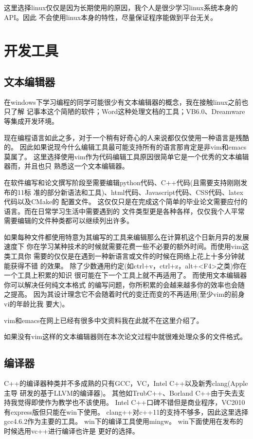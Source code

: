 这里选择linux仅仅是因为长期使用的原因，我个人是很少学习linux系统本身的API。因此
不会使用linux本身的特性，尽量保证程序能做到平台无关。

\section{开发工具}
\subsection{文本编辑器}
在windows下学习编程的同学可能很少有文本编辑器的概念，我在接触linux之前也只了解
记事本这个简陋的软件；Word这种处理文档的工具；VB6.0、Dreamware等集成开发环境。

现在编程语言如此之多，对于一个稍有好奇心的人来说都仅仅使用一种语言是残酷的。
因此如果说现今什么编辑工具最可能支持所有的语言那肯定是非vim和emacs莫属了。
这里选择使用vim作为代码编辑工具原因很简单它是一个优秀的文本编辑器而，并且也只
熟悉这一个文本编辑器。

在软件编写和论文撰写阶段至需要编辑python代码、C++代码(且需要支持刚刚发布的11标
准的部分新语法和工具)、html代码、Javascript代码、CSS代码、latex代码以及CMake的
配置文件。
这仅仅只是在完成这个简单的毕业论文需要应付的语言。而在日常学习生活中需要遇到的
文件类型更是各种各样，仅仅我个人平常需要编辑的文件种类都可以继续列出许多。

如果每种文件都使用特意为其编写的工具来编辑那么在计算机这个日新月异的发展速度下
你在学习某种技术的时候就需要花费一些不必要的额外时间。而使用vim这类工具你
需要的仅仅是在遇到一种新语言或文件的时候在网络上花上十多分钟就能获得不错
的效果。
除了少数通用约定(如ctrl+v，ctrl+z，alt+<F4>之类)你在一个工具上积累的知识
很可能在下一个工具上就不再适用了。 而使用文本编辑器你可以解决任何纯文本格式
的编写问题，你所积累的会越来越多你的效率也会随之提高。
因为其设计理念它不会随着时代的变迁而变的不再适用(至少vim的前身vi的年龄比我
要大)。

vim和emacs在网上已经有很多中文资料我在此就不在这里介绍了。

如果没有vim这样的文本编辑器则在本次论文过程中就很难处理众多的文件格式。

\subsection{编译器}
C++的编译器种类并不多成熟的只有GCC，VC，Intel C++以及新秀clang(Apple主导
研发的基于LLVM的编译器)。
其他如TrubC++、Borland C++由于失去支持我觉得即使作为教学也不该使用。
Intel C++口碑不错但是商业程序，VC2010有express版但只能在win下使用。
clang++对c++11的支持不够多，因此这里选择gcc4.6.2作为主要的工具。
win下的编译工具使用mingw。 win下面使用在发布的时候选用vc++进行编译也许是
更好的选择。

